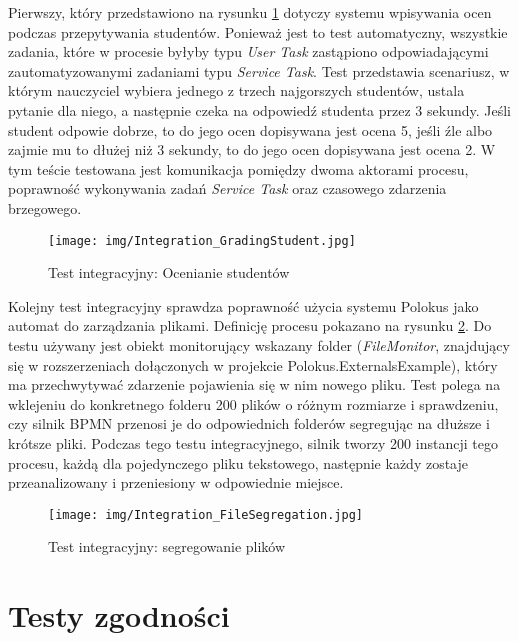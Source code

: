 \documentclass[declaration,shortabstract,mgr]{iithesis}
\newcommand{\bpmn}{BPMN }
\begin{document}
Pierwszy, który przedstawiono na rysunku \ref{fig:integration-grading} dotyczy systemu wpisywania ocen podczas przepytywania studentów. Ponieważ jest to test automatyczny, wszystkie zadania, które w procesie byłyby typu \textit{User Task} zastąpiono odpowiadającymi zautomatyzowanymi zadaniami typu \textit{Service Task}. Test przedstawia scenariusz, w którym nauczyciel wybiera jednego z trzech najgorszych studentów, ustala pytanie dla niego, a następnie czeka na odpowiedź studenta przez 3 sekundy. Jeśli student odpowie dobrze, to do jego ocen dopisywana jest ocena 5, jeśli źle albo zajmie mu to dłużej niż 3 sekundy, to do jego ocen dopisywana jest ocena 2. W tym teście testowana jest komunikacja pomiędzy dwoma aktorami procesu, poprawność wykonywania zadań \textit{Service Task} oraz czasowego zdarzenia brzegowego.

\begin{figure}[h]
     \centering
     \texttt{[image: img/Integration\_GradingStudent.jpg]}
     \caption{Test integracyjny: Ocenianie studentów}
     \label{fig:integration-grading}
\end{figure}

Kolejny test integracyjny sprawdza poprawność użycia systemu Polokus jako automat do zarządzania plikami. Definicję procesu pokazano na rysunku \ref{fig:integration-segregation}. Do testu używany jest obiekt monitorujący wskazany folder (\textit{FileMonitor}, znajdujący się w rozszerzeniach dołączonych w projekcie Polokus.ExternalsExample), który ma przechwytywać zdarzenie pojawienia się w nim nowego pliku. Test polega na wklejeniu do konkretnego folderu 200 plików o różnym rozmiarze i sprawdzeniu, czy silnik \bpmn przenosi je do odpowiednich folderów segregując na dłuższe i krótsze pliki. Podczas tego testu integracyjnego, silnik tworzy 200 instancji tego procesu, każdą dla pojedynczego pliku tekstowego, następnie każdy zostaje przeanalizowany i przeniesiony w odpowiednie miejsce.

\begin{figure}[h]
     \centering
     \texttt{[image: img/Integration\_FileSegregation.jpg]}
     \caption{Test integracyjny: segregowanie plików}
     \label{fig:integration-segregation}
\end{figure}




\section{Testy zgodności}
\end{document}
